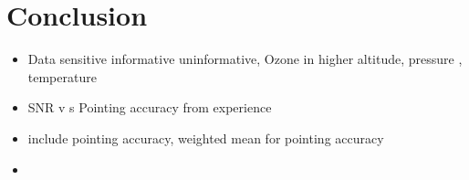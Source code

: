 \chapter{Conclusion}

\begin{itemize}
	\item Data sensitive informative uninformative, Ozone in higher altitude, pressure , temperature
	\item SNR v s Pointing accuracy from experience
	\item include pointing accuracy, weighted mean for pointing accuracy
	\item 
\end{itemize}